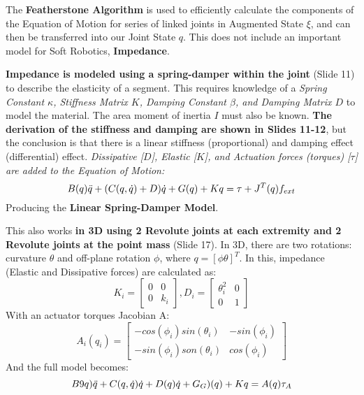 \documentclass[onecolumn,a4paper]{article}
\begin{document}
The \textbf{Featherstone Algorithm} is used to efficiently calculate the components of the Equation of Motion for series of linked joints in Augmented State $\xi$, and can then be transferred into our Joint State $q$. This does not include an important model for Soft Robotics, \textbf{Impedance}.

\textbf{Impedance is modeled using a spring-damper within the joint} (Slide 11) to describe the elasticity of a segment. This requires knowledge of a \emph{Spring Constant $\kappa$, Stiffness Matrix $K$, Damping Constant $\beta$, and Damping Matrix $D$} to model the material. The area moment of inertia $I$ must also be known. \textbf{The derivation of the stiffness and damping are shown in Slides 11-12}, but the conclusion is that there is a linear stiffness (proportional) and damping effect (differential) effect. \emph{Dissipative [$D$], Elastic [$K$], and Actuation forces (torques) [$\tau$] are added to the Equation of Motion:}
\begin{equation}
    B(q)\Ddot{q} + (C(q,\Dot{q}) + D)\Dot{q} + G(q) + Kq = \tau + J^T(q)f_{ext}
    \label{eq::EoM}
\end{equation}
Producing the \textbf{Linear Spring-Damper Model}.

This also works \textbf{in 3D using 2 Revolute joints at each extremity and 2 Revolute joints at the point mass} (Slide 17). In 3D, there are two rotations: curvature $\theta$ and off-plane rotation $\phi$, where $q = [\phi \theta]^T$. In this, impedance (Elastic and Dissipative forces) are calculated as:
\begin{equation}
    K_i = \left[\begin{array}{cc}
        0 & 0 \\
        0 & k_i
    \end{array}\right],
    D_i = \left[\begin{array}{cc}
        \theta_i^2 & 0 \\
        0 & 1
    \end{array}\right]
\end{equation}
With an actuator torques Jacobian A:
\begin{equation}
    A_i(q_i) = \left[\begin{array}{cc}
        -cos(\phi_i)sin(\theta_i) & -sin(\phi_i) \\
        -sin(\phi_i)son(\theta_i) & cos(\phi_i)
    \end{array}\right]
\end{equation}
And the full model becomes:
\begin{equation}
    B9q)\Ddot{q} + C(q, \Dot{q})\Dot{q} + D(q)\Dot{q}+G_G)(q)+Kq=A(q)\tau_A
\end{equation}
\end{document}

